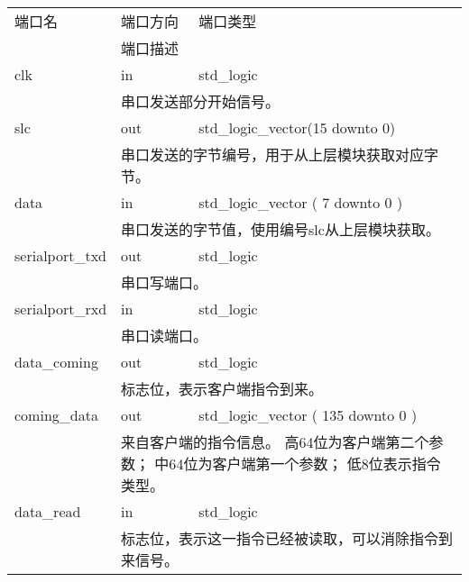        \begin{tabularx}{\textwidth}{lll}
            \toprule
            端口名          & 端口方向  & 端口类型 \\
            \cmidrule(l){2-3}
            &
            \multicolumn{2}{X}{端口描述} \\
            \midrule
            clk             & in        & std\_logic \\
            \cmidrule(l){2-3}
            &
            \multicolumn{2}{X}{
                串口发送部分开始信号。
            } \\
            \midrule
            slc             & out        & std\_logic\_vector(15 downto 0) \\
            \cmidrule(l){2-3}
            &
            \multicolumn{2}{X}{
                串口发送的字节编号，用于从上层模块获取对应字节。
            } \\
            \midrule
            data             & in        & std\_logic\_vector ( 7 downto 0 ) \\
            \cmidrule(l){2-3}
            &
            \multicolumn{2}{X}{
                串口发送的字节值，使用编号slc从上层模块获取。
            } \\
            \midrule
            serialport\_txd        & out      & std\_logic \\
            \cmidrule(l){2-3}
            &
            \multicolumn{2}{X}{
                串口写端口。
            } \\
            \midrule
            serialport\_rxd             & in        & std\_logic \\
            \cmidrule(l){2-3}
            &
            \multicolumn{2}{X}{
                串口读端口。
            } \\
            \midrule
            data\_coming             & out        & std\_logic \\
            \cmidrule(l){2-3}
            &
            \multicolumn{2}{X}{
                标志位，表示客户端指令到来。
            } \\
            \midrule
            coming\_data             & out        & std\_logic\_vector ( 135 downto 0 ) \\
            \cmidrule(l){2-3}
            &
            \multicolumn{2}{X}{
                来自客户端的指令信息。
                高64位为客户端第二个参数；
                中64位为客户端第一个参数；
                低8位表示指令类型。
            } \\
            \midrule
            data\_read             & in        & std\_logic \\
            \cmidrule(l){2-3}
            &
            \multicolumn{2}{X}{
                标志位，表示这一指令已经被读取，可以消除指令到来信号。
            } \\
            \bottomrule
        \end{tabularx}

